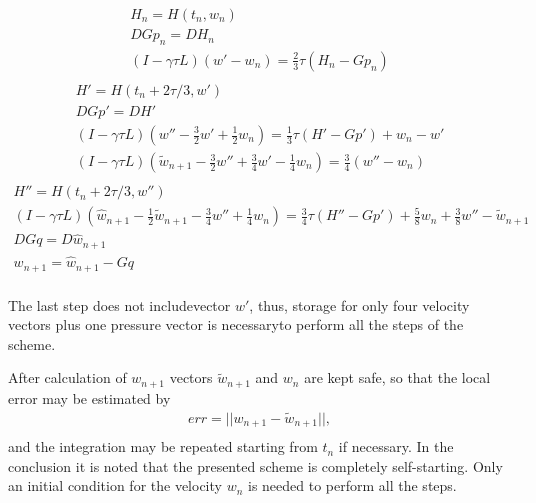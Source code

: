 \documentclass[11pt]{article}
\begin{document}
\begin{equation}\begin{aligned}
  H_n = H(t_n,w_n) \\
  D G p_n = D H_n \\
  (I - \gamma \tau L) (w' - w_n) = \frac{2}{3} \tau (H_n - G p_n) \\
\end{aligned}\end{equation}
\begin{equation}\begin{aligned}
  H' = H(t_n + 2 \tau/3,w') \\
  D G p' = D H' \\
  (I - \gamma \tau L) (w'' - \frac{3}{2}w' + \frac{1}{2} w_n) = \frac{1}{3} \tau (H' - G p') + w_n - w' \\
  (I - \gamma \tau L) (\tilde{w}_{n+1} - \frac{3}{2}w'' + \frac{3}{4} w' - \frac{1}{4}w_n) = \frac{3}{4} (w'' - w_n) \\
\end{aligned}\end{equation}
\begin{equation}\begin{aligned}
  H'' = H(t_n + 2 \tau/3,w'') \\
  (I - \gamma \tau L) (\hat{w}_{n+1} - \frac{1}{2} \tilde{w}_{n+1} - \frac{3}{4} w'' + \frac{1}{4} w_n) = \frac{3}{4} \tau (H'' - G p') + \frac{5}{8} w_n + \frac{3}{8} w'' - \tilde{w}_{n+1} \\
  D G q = D \hat{w}_{n+1} \\
  w_{n+1} = \hat{w}_{n+1} - Gq \\
\end{aligned}\end{equation}

The last step does not includevector $w'$, thus, storage for only four velocity vectors plus one pressure vector is necessaryto perform all the steps of the scheme.

After calculation of $w_{n+1}$ vectors $\tilde{w}_{n+1}$ and $w_n$ are kept safe, so that the local error may be estimated by
\begin{equation}\begin{aligned}
 err = || w_{n+1} - \tilde{w}_{n+1} ||, \\
\end{aligned}\end{equation}
and the integration may be repeated starting from $t_n$ if necessary. In the conclusion it is noted that the presented scheme is completely self-starting. Only an initial condition for the velocity $w_n$ is needed to perform all the steps.
\end{document}
